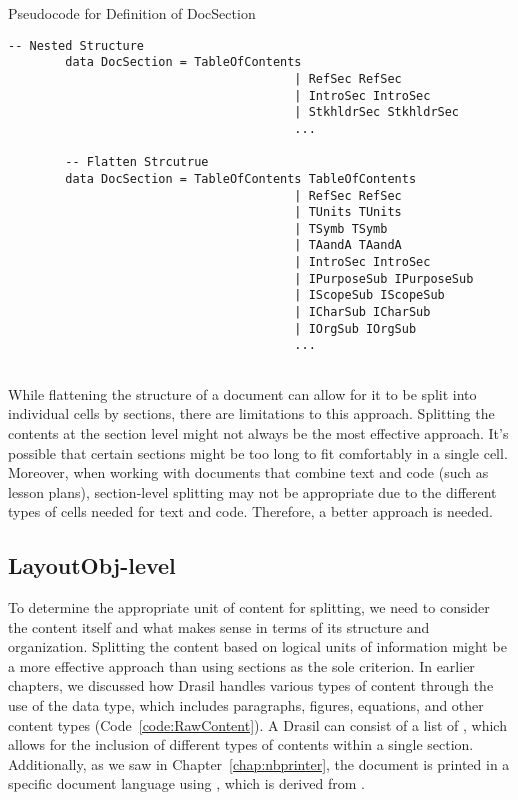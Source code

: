 \begin{listing}[h]
	\caption{Pseudocode for Definition of DocSection}
	\label{code:DocSection}
	\begin{lstlisting}[language=haskell1]
		-- Nested Structure
		data DocSection = TableOfContents
										| RefSec RefSec
										| IntroSec IntroSec
										| StkhldrSec StkhldrSec
										...
		
		-- Flatten Strcutrue
		data DocSection = TableOfContents TableOfContents
										| RefSec RefSec
										| TUnits TUnits
										| TSymb TSymb
										| TAandA TAandA
										| IntroSec IntroSec
										| IPurposeSub IPurposeSub
										| IScopeSub IScopeSub
										| ICharSub ICharSub
										| IOrgSub IOrgSub
										...
		
	\end{lstlisting}
\end{listing}
 
While flattening the structure of a document can allow for it to be split into 
individual cells by sections, there are limitations to this approach. Splitting 
the contents at the section level might not always be the most effective 
approach. It's possible that certain sections might be too long to fit 
comfortably in a single cell. Moreover, when working with documents that 
combine text and code (such as lesson plans), section-level splitting may not 
be appropriate due to the different types of cells needed for text and code. 
Therefore, a better approach is needed.

\subsection{LayoutObj-level}
To determine the appropriate unit of content for splitting, we need to consider 
the content itself and what makes sense in terms of its structure and 
organization. Splitting the content based on logical units of information might 
be a more effective approach than using sections as the sole criterion. In 
earlier chapters, we discussed how Drasil handles various types of content 
through the use of the  data type, which includes 
paragraphs, figures, equations, and other content types 
(Code~\ref{code:RawContent}). A Drasil  can consist of a list 
of , which allows for the inclusion of different types of 
contents within a single section. Additionally, as we saw in 
Chapter~\ref{chap:nbprinter}, the document is printed in a specific document 
language using , which is derived from .
